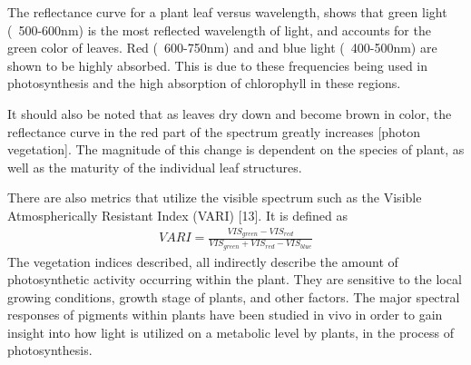 
The reflectance curve for a plant leaf versus wavelength, shows that green light (~500-600nm) is the most reflected wavelength of light, and accounts for the green color of leaves. Red (~600-750nm) and and blue light (~400-500nm) are shown to be highly absorbed.  This is due to these frequencies being used in photosynthesis and the high absorption of chlorophyll in these regions.

It should also be noted that as leaves dry down and become brown in color, the reflectance curve in the red part of the spectrum greatly increases [photon vegetation].  The magnitude of this change is dependent on the species of plant, as well as the maturity of the individual leaf structures.

There are also metrics that utilize the visible spectrum such as the Visible Atmospherically Resistant Index (VARI) [13].  It is defined as
%
\begin{align}
    VARI = \frac{VIS_{green} - VIS_{red}}{VIS_{green} + VIS_{red}-VIS_{blue}}
\end{align}
%
The vegetation indices described, all indirectly describe the amount of photosynthetic activity occurring within the plant.  They are sensitive to the local growing conditions, growth stage of plants, and other factors. The major spectral responses of pigments within plants have been studied in vivo in order to gain insight into how light is utilized on a metabolic level by plants, in the process of photosynthesis.
